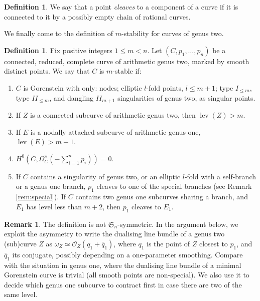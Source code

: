 \documentclass[11pt]{amsart}
\newcommand{\OO}{\mathcal O}
\newcommand{\lev}{\operatorname{lev}}
\theoremstyle{plain}
\theoremstyle{definition}
\newtheorem{dfn}[thm]{Definition}
\newtheorem{rem}[thm]{Remark}
\begin{document}
\begin{dfn}
We say that a point \emph{cleaves} to a component of a curve if it is connected to it by a possibly empty chain of rational curves. 
\end{dfn}

We finally come to the definition of $m$-stability for curves of genus two.
\begin{dfn}\label{def:m-stability}
 Fix positive integers $1\leq m<n$. Let $(C,p_1,\ldots,p_n)$ be a connected, reduced, complete curve of arithmetic genus two, marked by smooth distinct points. We say that $C$ is $m$-stable if:
 \begin{enumerate}[leftmargin=.7cm]
  \item\label{cond:sing} $C$ is Gorenstein with only: nodes; elliptic $l$-fold points, $l\leq m+1$; type $I_{\leq m}$, type $I\!I_{\leq m}$, and dangling $I\!I_{m+1}$ singularities of genus two, as singular points.
  \item\label{cond:lev2} If $Z$ is a connected subcurve of arithmetic genus two, then $\lev(Z)>m$.
  \item\label{cond:lev1} If $E$ is a nodally attached subcurve of arithmetic genus one, $\lev(E)>m+1$.
  \item\label{cond:aut} $H^0(C,\Omega_C^\vee(-\sum_{i=1}^n p_i))=0$.
  \item\label{cond:p1} If $C$ contains a singularity of genus two, or an elliptic $l$-fold with a self-branch or a genus one branch, $p_1$ cleaves to one of the special branches (see Remark \ref{rem:special}). If $C$ contains two genus one subcurves sharing a branch, and $E_1$ has level less than $m+2$, then $p_1$ cleaves to $E_1$.
 \end{enumerate}
\end{dfn}

\begin{rem}
 The definition is not $\mathfrak{S}_n$-symmetric. In the argument below, we exploit the asymmetry to write the dualising line bundle of a genus two (sub)curve $Z$ as $\omega_Z\simeq\OO_Z(q_1+\bar q_1)$, where $q_1$ is the point of $Z$ closest to $p_1$, and $\bar q_1$ its conjugate, possibly depending on a one-parameter smoothing. Compare with the situation in genus one, where the dualising line bundle of a minimal Gorenstein curve is trivial (all smooth points are non-special). We also use it to decide which genus one subcurve to contract first in case there are two of the same level.
\end{rem}
\end{document}
